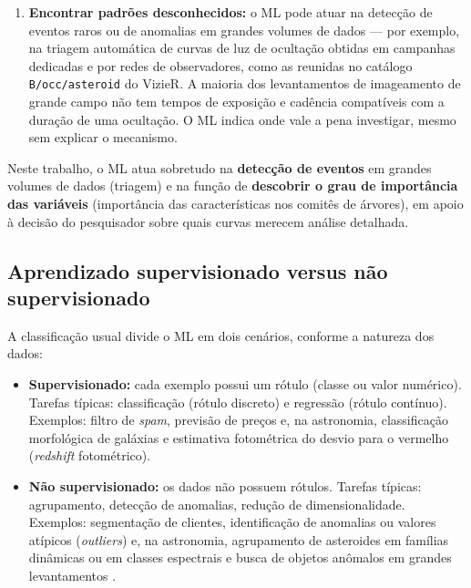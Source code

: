 \begin{enumerate}
	\item[(v)] \textbf{Encontrar padrões desconhecidos:} o ML pode atuar na detecção de eventos raros ou de anomalias em grandes volumes de dados --- por exemplo, na triagem automática de curvas de luz de ocultação obtidas em campanhas dedicadas e por redes de observadores, como as reunidas no catálogo \texttt{B/occ/asteroid} do VizieR. A maioria dos levantamentos de imageamento de grande campo não tem tempos de exposição e cadência compatíveis com a duração de uma ocultação. O ML indica onde vale a pena investigar, mesmo sem explicar o mecanismo.
\end{enumerate}

Neste trabalho, o ML atua sobretudo na \textbf{detecção de eventos} em grandes volumes de dados (triagem) e na função de \textbf{descobrir o grau de importância das variáveis} (importância das características nos comitês de árvores), em apoio à decisão do pesquisador sobre quais curvas merecem análise detalhada.

\subsection{Aprendizado supervisionado versus não supervisionado}

A classificação usual divide o ML em dois cenários, conforme a natureza dos dados:

\begin{itemize}
	\item \textbf{Supervisionado:} cada exemplo possui um rótulo (classe ou valor numérico). Tarefas típicas: classificação (rótulo discreto) e regressão (rótulo contínuo). Exemplos: filtro de \textit{spam}, previsão de preços e, na astronomia, classificação morfológica de galáxias e estimativa fotométrica do desvio para o vermelho (\textit{redshift} fotométrico).
	\item \textbf{Não supervisionado:} os dados não possuem rótulos. Tarefas típicas: agrupamento, detecção de anomalias, redução de dimensionalidade. Exemplos: segmentação de clientes, identificação de anomalias ou valores atípicos (\textit{outliers}) e, na astronomia, agrupamento de asteroides em famílias dinâmicas ou em classes espectrais e busca de objetos anômalos em grandes levantamentos \citep{Ivezic2014}.
\end{itemize}

